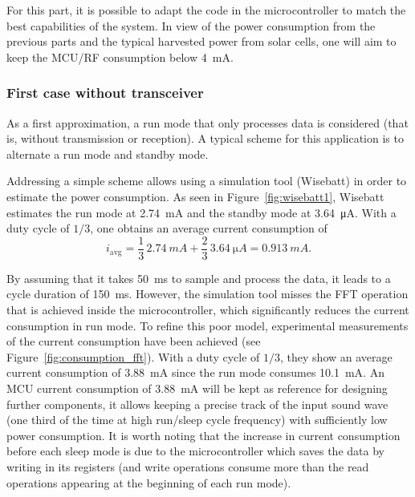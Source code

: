 \documentclass{EPL-master-thesis-covers-EN}
\newcommand{\te}[1]{\textrm{#1}}
\begin{document}

For this part, it is possible to adapt the code in the microcontroller to match the best capabilities of the system.
In view of the power consumption from the previous parts and the typical harvested power from solar cells, one will aim to keep the MCU/RF consumption below \SI{4}{mA}. 

\subsubsection*{First case without transceiver}

As a first approximation, a run mode that only processes data is considered (that is, without transmission or reception). A typical scheme for this application is to alternate a run mode and standby mode.

Addressing a simple scheme allows using a simulation tool (Wisebatt) in order to estimate the power consumption. As seen in Figure~\ref{fig:wisebatt1}, Wisebatt estimates the run mode at \SI{2.74}{mA} and the standby mode at \SI{3.64}{\micro A}. With a duty cycle of $1/3$, one obtains an average current consumption of
\[
 i_\te{avg} = \frac{1}{3} \, \SI{2.74}{mA} + \frac{2}{3} \, \SI{3.64}{\micro A} = \SI{0.913}{mA}.
\]

By assuming that it takes \SI{50}{ms} to sample and process the data, it leads to a cycle duration of \SI{150}{ms}. However, the simulation tool misses the FFT operation that is achieved inside the microcontroller, which significantly reduces the current consumption in run mode. To refine this poor model, experimental measurements of the current consumption have been achieved (see Figure~\ref{fig:consumption_fft}). With a duty cycle of $1/3$, they show an average current consumption of \SI{3.88}{mA} since the run mode consumes \SI{10.1}{mA}. An MCU current consumption of \SI{3.88}{mA} will be kept as reference for designing further components, it allows keeping a precise track of the input sound wave (one third of the time at high run/sleep cycle frequency) with sufficiently low power consumption. It is worth noting that the increase in current consumption before each sleep mode is due to the microcontroller which saves the data by writing in its registers (and write operations consume more than the read operations appearing at the beginning of each run mode).
\end{document}
